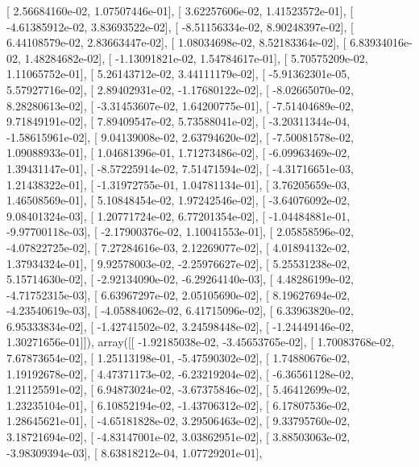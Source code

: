 \documentclass{article}
\begin{document}
       [  2.56684160e-02,   1.07507446e-01],
       [  3.62257606e-02,   1.41523572e-01],
       [ -4.61385912e-02,   3.83693522e-02],
       [ -8.51156334e-02,   8.90248397e-02],
       [  6.44108579e-02,   2.83663447e-02],
       [  1.08034698e-02,   8.52183364e-02],
       [  6.83934016e-02,   1.48284682e-02],
       [ -1.13091821e-02,   1.54784617e-01],
       [  5.70575209e-02,   1.11065752e-01],
       [  5.26143712e-02,   3.44111179e-02],
       [ -5.91362301e-05,   5.57927716e-02],
       [  2.89402931e-02,  -1.17680122e-02],
       [ -8.02665070e-02,   8.28280613e-02],
       [ -3.31453607e-02,   1.64200775e-01],
       [ -7.51404689e-02,   9.71849191e-02],
       [  7.89409547e-02,   5.73588041e-02],
       [ -3.20311344e-04,  -1.58615961e-02],
       [  9.04139008e-02,   2.63794620e-02],
       [ -7.50081578e-02,   1.09088933e-01],
       [  1.04681396e-01,   1.71273486e-02],
       [ -6.09963469e-02,   1.39431147e-01],
       [ -8.57225914e-02,   7.51471594e-02],
       [ -4.31716651e-03,   1.21438322e-01],
       [ -1.31972755e-01,   1.04781134e-01],
       [  3.76205659e-03,   1.46508569e-01],
       [  5.10848454e-02,   1.97242546e-02],
       [ -3.64076092e-02,   9.08401324e-03],
       [  1.20771724e-02,   6.77201354e-02],
       [ -1.04484881e-01,  -9.97700118e-03],
       [ -2.17900376e-02,   1.10041553e-01],
       [  2.05858596e-02,  -4.07822725e-02],
       [  7.27284616e-03,   2.12269077e-02],
       [  4.01894132e-02,   1.37934324e-01],
       [  9.92578003e-02,  -2.25976627e-02],
       [  5.25531238e-02,   5.15714630e-02],
       [ -2.92134090e-02,  -6.29264140e-03],
       [  4.48286199e-02,  -4.71752315e-03],
       [  6.63967297e-02,   2.05105690e-02],
       [  8.19627694e-02,  -4.23540619e-03],
       [ -4.05884062e-02,   6.41715096e-02],
       [  6.33963820e-02,   6.95333834e-02],
       [ -1.42741502e-02,   3.24598448e-02],
       [ -1.24449146e-02,   1.30271656e-01]]), array([[ -1.92185038e-02,  -3.45653765e-02],
       [  1.70083768e-02,   7.67873654e-02],
       [  1.25113198e-01,  -5.47590302e-02],
       [  1.74880676e-02,   1.19192678e-02],
       [  4.47371173e-02,  -6.23219204e-02],
       [ -6.36561128e-02,   1.21125591e-02],
       [  6.94873024e-02,  -3.67375846e-02],
       [  5.46412699e-02,   1.23235104e-01],
       [  6.10852194e-02,  -1.43706312e-02],
       [  6.17807536e-02,   1.28645621e-01],
       [ -4.65181828e-02,   3.29506463e-02],
       [  9.33795760e-02,   3.18721694e-02],
       [ -4.83147001e-02,   3.03862951e-02],
       [  3.88503063e-02,  -3.98309394e-03],
       [  8.63818212e-04,   1.07729201e-01],
\end{document}
